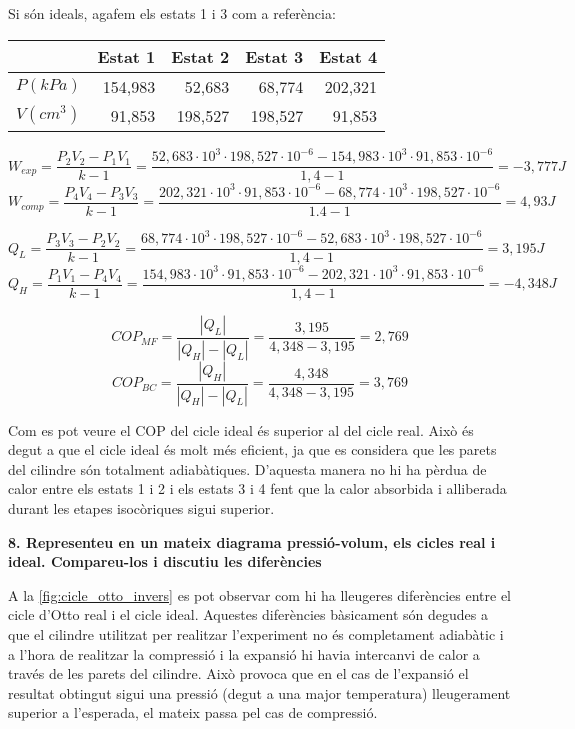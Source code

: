 \documentclass[a4paper]{article}
\begin{document}
Si són ideals, agafem els estats 1 i 3 com a referència:

\begin{center}
	\begin{tabular}{l|rrrr}
		& Estat 1 & Estat 2 & Estat 3 & Estat 4 \\
		\hline
		$P(kPa)$ & 154,983 & 52,683  & 68,774 &  202,321 \\
		$V(cm^3)$ & 91,853 & 198,527 & 198,527 & 91,853 \\
	\end{tabular}
\end{center}

$$ W_{exp} = \frac{P_2 V_2 - P_1 V_1}{k - 1} = 
\frac{52,683·10^3 · 198,527·10^{-6} - 154,983·10^3 · 91,853·10^{-6}}{1,4 - 1} =
\boxed{-3,777J} 
$$
$$ W_{comp} = \frac{P_4 V_4 - P_3 V_3}{k - 1} = 
\frac{202,321·10^3 · 91,853·10^{-6} - 68,774·10^3 · 198,527·10^{-6}}{1.4 - 1} =
\boxed{4,93J}
$$

$$ Q_L = \frac{P_3 V_3 - P_2 V_2}{k - 1} = 
\frac{68,774·10^3 · 198,527·10^{-6} - 52,683·10^3 · 198,527·10^{-6}}{1,4 - 1} = 
\boxed{3,195J}
$$
$$ Q_H = \frac{P_1 V_1 - P_4 V_4}{k - 1} =
\frac{154,983·10^3 · 91,853·10^{-6} - 202,321·10^3 · 91,853·10^{-6}}{1,4 - 1} =
\boxed{-4,348J}
$$

$$ 
COP_{MF} = \frac{|Q_L|}{|Q_H| - |Q_L|} =
\frac{3,195}{4,348 - 3,195} = \boxed{2,769} 
$$
$$ 
COP_{BC} = \frac{|Q_H|}{|Q_H| - |Q_L|} =
\frac{4,348}{4,348 - 3,195} = \boxed{3,769} 
$$

Com es pot veure el COP del cicle ideal és superior al del cicle real. Això és degut a que el cicle ideal és molt més eficient, ja que es considera que les parets del cilindre són totalment adiabàtiques. D'aquesta manera no hi ha pèrdua de calor entre els estats 1 i 2 i els estats 3 i 4 fent que la calor absorbida i alliberada durant les etapes isocòriques sigui superior.

\textbf{8. Representeu en un mateix diagrama pressió-volum, els cicles real i ideal. Compareu-los i discutiu les diferències}

A la \autoref{fig:cicle_otto_invers} es pot observar com hi ha lleugeres diferències entre el cicle d'Otto real i el cicle ideal. Aquestes diferències bàsicament són degudes a que el cilindre utilitzat per realitzar l'experiment no és completament adiabàtic i a l'hora de realitzar la compressió i la expansió hi havia intercanvi de calor a través de les parets del cilindre. Això provoca que en el cas de l'expansió el resultat obtingut sigui una pressió (degut a una major temperatura) lleugerament superior a l'esperada, el mateix passa pel cas de compressió.
\end{document}
